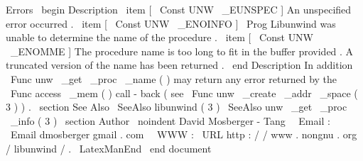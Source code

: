 {
Errors
}
\
begin
{
Description
}
\
item
[
\
Const
{
UNW
\
_EUNSPEC
}
]
An
unspecified
error
occurred
.
\
item
[
\
Const
{
UNW
\
_ENOINFO
}
]
\
Prog
{
Libunwind
}
was
unable
to
determine
the
name
of
the
procedure
.
\
item
[
\
Const
{
UNW
\
_ENOMME
}
]
The
procedure
name
is
too
long
to
fit
in
the
buffer
provided
.
A
truncated
version
of
the
name
has
been
returned
.
\
end
{
Description
}
In
addition
\
Func
{
unw
\
_get
\
_proc
\
_name
}
(
)
may
return
any
error
returned
by
the
\
Func
{
access
\
_mem
}
(
)
call
-
back
(
see
\
Func
{
unw
\
_create
\
_addr
\
_space
}
(
3
)
)
.
\
section
{
See
Also
}
\
SeeAlso
{
libunwind
(
3
)
}
\
SeeAlso
{
unw
\
_get
\
_proc
\
_info
(
3
)
}
\
section
{
Author
}
\
noindent
David
Mosberger
-
Tang
\
\
Email
:
\
Email
{
dmosberger
gmail
.
com
}
\
\
WWW
:
\
URL
{
http
:
/
/
www
.
nongnu
.
org
/
libunwind
/
}
.
\
LatexManEnd
\
end
{
document
}
